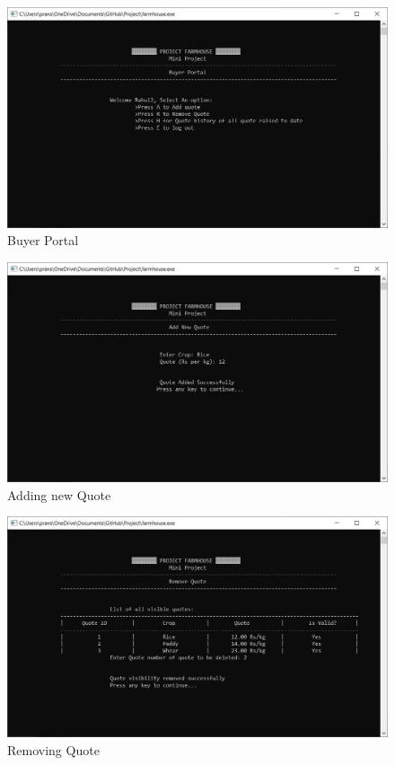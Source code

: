 \documentclass[12pt]{article}
\begin{document}
\begin{figure}[h!]
    \centering
    \includegraphics[width = \columnwidth]{ScreenShots/Buyer_1.JPG}
    \caption{Buyer Portal}
\end{figure}

\begin{figure}[h!]
    \centering
    \includegraphics[width = \columnwidth]{ScreenShots/Buyer_2.JPG}
    \caption{Adding new Quote}
\end{figure}

\begin{figure}[h!]
    \centering
    \includegraphics[width = \columnwidth]{ScreenShots/Buyer_4.JPG}
    \caption{Removing Quote}
\end{figure}
\end{document}
